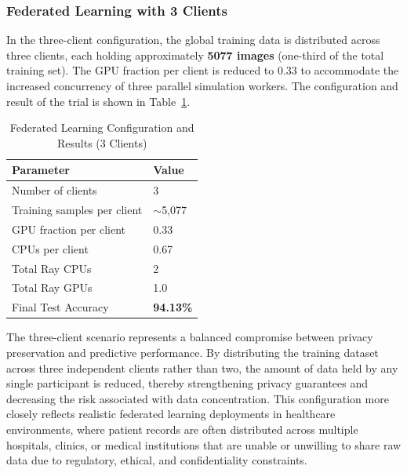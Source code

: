 \subsubsection{Federated Learning with 3 Clients}
In the three-client configuration, the global training data is distributed across three clients, each holding approximately \textbf{\num{5077} images} (one-third of the total training set). The GPU fraction per client is reduced to 0.33 to accommodate the increased concurrency of three parallel simulation workers. The configuration and result of the trial is shown in Table~\ref{tab:fl_3}.

\begin{table}[H]
	\centering
	\caption{Federated Learning Configuration and Results (3 Clients)}
	\label{tab:fl_3}
	\renewcommand{\arraystretch}{1.2}
	\begin{tabular}{|l|l|}
		\hline
		\textbf{Parameter} & \textbf{Value} \\
		\hline
		Number of clients & 3 \\
		\hline
		Training samples per client & $\sim$5,077 \\
		\hline
		GPU fraction per client & 0.33 \\
		\hline
		CPUs per client & 0.67 \\
		\hline
		Total Ray CPUs & 2 \\
		\hline
		Total Ray GPUs & 1.0 \\
		\hline
		Final Test Accuracy & \textbf{94.13\%} \\
		\hline
	\end{tabular}
\end{table}

The three-client scenario represents a balanced compromise between privacy preservation and predictive performance. By distributing the training dataset across three independent clients rather than two, the amount of data held by any single participant is reduced, thereby strengthening privacy guarantees and decreasing the risk associated with data concentration. This configuration more closely reflects realistic federated learning deployments in healthcare environments, where patient records are often distributed across multiple hospitals, clinics, or medical institutions that are unable or unwilling to share raw data due to regulatory, ethical, and confidentiality constraints.

